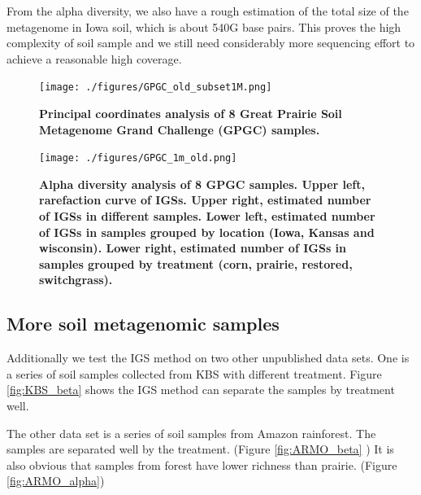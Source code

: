  From the alpha diversity, we also have a rough estimation of the  total 
 size of the metagenome in Iowa soil, which is about 540G base pairs. This 
 proves the high complexity of soil sample and we still need considerably more sequencing 
 effort to achieve a reasonable high coverage.
 

\begin{figure}[!ht]
 \centerline{\texttt{[image: ./figures/GPGC\_old\_subset1M.png]}}
\caption{\bf Principal coordinates analysis of 8 Great Prairie Soil Metagenome
Grand Challenge (GPGC) samples.}
\label{fig:GPGC_beta}
\end{figure}



\begin{figure}[!ht]
 \centerline{\texttt{[image: ./figures/GPGC\_1m\_old.png]}}
\caption{\bf Alpha diversity analysis of 8 GPGC samples. Upper left,
rarefaction curve of IGSs. Upper right, estimated number of IGSs in different
samples. Lower left, estimated number of IGSs in samples grouped by
location (Iowa, Kansas and wisconsin). Lower right, estimated number of IGSs in
samples grouped by treatment (corn, prairie, restored, switchgrass).}
\label{fig:GPGC-alpha}
\end{figure}






\subsection{More soil metagenomic samples}

Additionally we test the IGS method on two other unpublished data sets. 
One is a series of soil samples
collected from KBS with different treatment. Figure \ref{fig:KBS_beta}
shows the IGS method can separate
the samples by treatment well. 

The other data set is a series of soil samples from Amazon rainforest. 
The samples are separated well
by the treatment. (Figure \ref{fig:ARMO_beta} ) It is also obvious 
that samples from forest have 
lower richness than prairie.  (Figure \ref{fig:ARMO_alpha})





